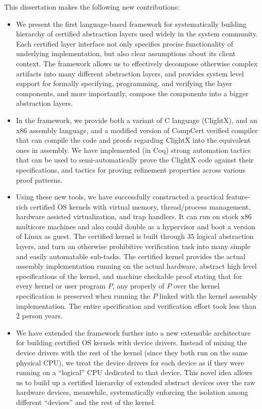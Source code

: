 This dissertation makes the following new contributions:
\begin{itemize}
\item We present the first language-based framework for systematically
building hierarchy of certified abstraction layers used widely in the system
community. Each certified layer interface not only specifies precise functionality
of underlying implementation, but also clear assumptions about its client context.
The framework allows us to effectively decompose otherwise complex
artifacts into many different abstraction layers, and provides system level support
for formally specifying, programming, and verifying the layer components,
and more importantly, compose the components into a bigger abstraction layers.

\item In the framework, we provide both a variant of C language (ClightX),
and an x86 assembly language, and a modified version of CompCert verified
compiler that can compile the code and proofs regarding ClightX into
the equivalent ones in assembly. We have implemented (in Coq) strong
automation tactics that can be used to semi-automatically prove the
ClightX code against their specifications, and tactics for proving refinement
properties across various proof patterns.

\item Using these new tools, we have successfully constructed a
practical feature-rich certified OS kernels with virtual memory,
thread/process management, hardware assisted virtualization,
and trap handlers. It can run on stock x86 multicore machines
and also could double as a hypervisor and boot a version of Linux as guest.
The certified kernel is built through 35 logical
abstraction layers, and turn
an otherwise prohibitive verification task into many simple
and easily automatable sub-tasks.
The certified
kernel provides the actual assembly implementation running on the
actual hardware, abstract high level specifications of the kernel,
and machine checkable proof stating that for every kernel or user
program $P$, any properly of $P$ over the kernel specification
is preserved when running the $P$ linked with the kernel assembly
implementation.  The entire specification and verification
effort took less than 2 person years.

\item We have extended the framework further into a new extensible
architecture for building certified
  OS kernels with device drivers. Instead of mixing the device drivers
  with the rest of the kernel (since they both run on the same
  physical CPU), we treat the device drivers for each device as if
  they were running on a ``logical'' CPU dedicated to that device.
  This novel idea allows us to build up a certified hierarchy of
  extended abstract devices over the raw hardware devices, meanwhile,
  systematically enforcing the isolation among different ``devices''
  and the rest of the kernel.


\end{itemize}
